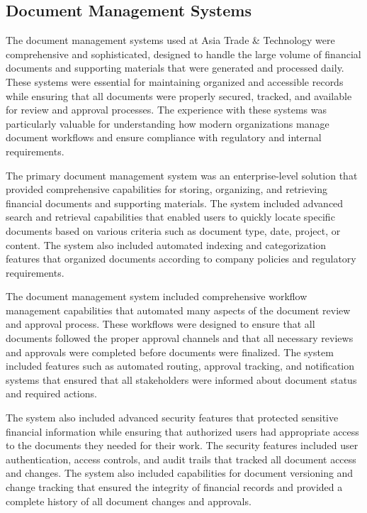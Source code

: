 \subsection{Document Management Systems}
The document management systems used at Asia Trade \& Technology were comprehensive and sophisticated, designed to handle the large volume of financial documents and supporting materials that were generated and processed daily. These systems were essential for maintaining organized and accessible records while ensuring that all documents were properly secured, tracked, and available for review and approval processes. The experience with these systems was particularly valuable for understanding how modern organizations manage document workflows and ensure compliance with regulatory and internal requirements.

The primary document management system was an enterprise-level solution that provided comprehensive capabilities for storing, organizing, and retrieving financial documents and supporting materials. The system included advanced search and retrieval capabilities that enabled users to quickly locate specific documents based on various criteria such as document type, date, project, or content. The system also included automated indexing and categorization features that organized documents according to company policies and regulatory requirements.

The document management system included comprehensive workflow management capabilities that automated many aspects of the document review and approval process. These workflows were designed to ensure that all documents followed the proper approval channels and that all necessary reviews and approvals were completed before documents were finalized. The system included features such as automated routing, approval tracking, and notification systems that ensured that all stakeholders were informed about document status and required actions.

The system also included advanced security features that protected sensitive financial information while ensuring that authorized users had appropriate access to the documents they needed for their work. The security features included user authentication, access controls, and audit trails that tracked all document access and changes. The system also included capabilities for document versioning and change tracking that ensured the integrity of financial records and provided a complete history of all document changes and approvals.

